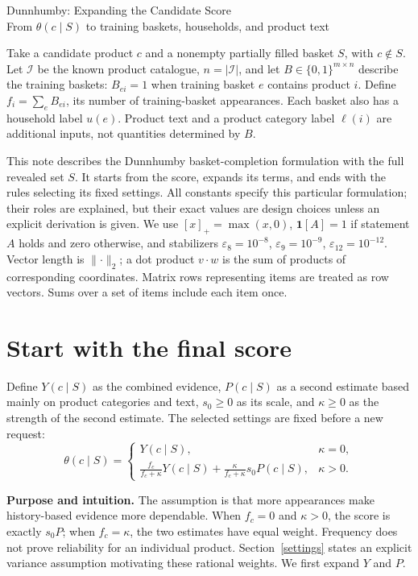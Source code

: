 \documentclass[11pt,a4paper]{article}
\newcommand{\I}{\mathcal I}\newcommand{\pos}[1]{\left[#1\right]_+}
\newcommand{\why}{\par\textbf{Purpose and intuition.} }
\numberwithin{equation}{section}
\begin{document}
\begin{center}
{\LARGE\textcolor{ink}{Dunnhumby: Expanding the Candidate Score}}\\[6pt]
{\large From $\theta(c\mid S)$ to training baskets, households, and product text}
\end{center}\medskip
Take a candidate product $c$ and a nonempty partially filled basket $S$, with $c\notin S$.
Let $\I$ be the known product catalogue, $n=|\I|$, and let
$B\in\{0,1\}^{m\times n}$ describe the training baskets: $B_{ei}=1$ when training
basket $e$ contains product $i$. Define $f_i=\sum_e B_{ei}$, its number of training-basket
appearances. Each basket also has a household label $u(e)$. Product text and a product
category label $\ell(i)$ are additional inputs, not quantities determined by $B$.

This note describes the Dunnhumby basket-completion formulation with the full revealed set
$S$. It starts from the score, expands its terms, and ends with the rules selecting its
fixed settings. All constants specify this particular formulation; their roles are explained,
but their exact values are design choices unless an explicit derivation is given.
We use $[x]_+=\max(x,0)$, $\mathbf1[A]=1$ if statement $A$ holds and zero otherwise,
and stabilizers $\varepsilon_8=10^{-8}$, $\varepsilon_9=10^{-9}$,
$\varepsilon_{12}=10^{-12}$. Vector length is $\lVert\cdot\rVert_2$; a dot product
$v\cdot w$ is the sum of products of corresponding coordinates. Matrix rows representing
items are treated as row vectors. Sums over a set of items include each item once.

\section{Start with the final score}
Define $Y(c\mid S)$ as the combined evidence, $P(c\mid S)$ as a second estimate based
mainly on product categories and text, $s_0\ge0$ as its scale, and $\kappa\ge0$ as the
strength of the second estimate. The selected settings are fixed before a new request:
\begin{equation}\label{theta}
\boxed{\theta(c\mid S)=\begin{cases}
Y(c\mid S),&\kappa=0,\\[2pt]
\displaystyle\frac{f_c}{f_c+\kappa}Y(c\mid S)
+\frac{\kappa}{f_c+\kappa}s_0P(c\mid S),&\kappa>0.
\end{cases}}
\end{equation}
\why The assumption is that more appearances make history-based evidence more dependable.
When $f_c=0$ and $\kappa>0$, the score is exactly $s_0P$; when $f_c=\kappa$, the two
estimates have equal weight. Frequency does not prove reliability for an individual product.
Section~\ref{settings} states an explicit variance assumption motivating these rational
weights. We first expand $Y$ and $P$.
\end{document}
